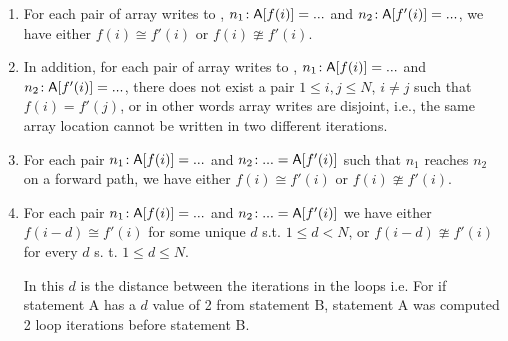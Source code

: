 \begin{enumerate}
\item For each pair of array writes to \A, $n_1\!: {\sf A}[f(i)] = ... $ and $n_2\!: {\sf A}[f'(i)] = ... $, we have either $f(i) \cong f'(i)$ or 
$f(i) \ncong f'(i)$. 

\item In addition, for each pair of array writes to \A, $n_1\!: {\sf A}[f(i)] = ... $ and $n_2\!: {\sf A}[f'(i)] = ... $, there does not exist 
a pair $1 \le i, j \le N$, $i \neq j$ such that $f(i) = f'(j)$, or in other words array writes are disjoint, i.e., the same array location 
cannot be written in two different iterations. 

\item For each pair $n_1\!: {\sf A}[f(i)] = ... $ and $n_2\!: ... = {\sf A}[f'(i)]$ such that $n_1$ reaches $n_2$ on a forward path, 
we have either $f(i) \cong f'(i)$ or $f(i) \ncong f'(i)$. 


\item For each pair $n_1\!: {\sf A}[f(i)] = ... $ and $n_2\!: ... = {\sf A}[f'(i)]$ %
we have either $f(i-d) \cong f'(i)$ for some unique $d$ s.t. $1 \le d < N$, or $f(i-d) \ncong f'(i)$ for every $d$ s. t. $1 \le d \le N$. 

In this $d$ is the distance between the iterations in the loops i.e. For if statement A has a $d$ value of 2 from statement B, 
statement A was computed 2 loop iterations before statement B.

\end{enumerate}

